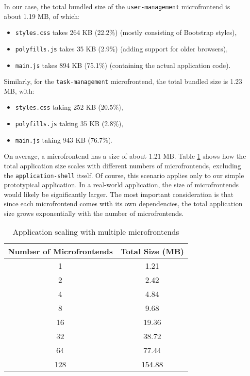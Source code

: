 \noindent
In our case, the total bundled size of the \texttt{user-management} microfrontend is about 1.19 MB, of which:  
\begin{itemize}
    \item \texttt{styles.css} takes 264 KB (22.2\%) (mostly consisting of Bootstrap styles),
    \item \texttt{polyfills.js} takes 35 KB (2.9\%) (adding support for older browsers),
    \item \texttt{main.js} takes 894 KB (75.1\%) (containing the actual application code).
\end{itemize}  
Similarly, for the \texttt{task-management} microfrontend, the total bundled size is 1.23 MB, with:  
\begin{itemize}
    \item \texttt{styles.css} taking 252 KB (20.5\%),
    \item \texttt{polyfills.js} taking 35 KB (2.8\%),
    \item \texttt{main.js} taking 943 KB (76.7\%).
\end{itemize}  
On average, a microfrontend has a size of about 1.21 MB. Table \ref{table:app-scaling} shows how the total application size scales with different numbers of microfrontends, excluding the \texttt{application-shell} itself. Of course, this scenario applies only to our simple prototypical application. In a real-world application, the size of microfrontends would likely be significantly larger. The most important consideration is that since each microfrontend comes with its own dependencies, the total application size grows exponentially with the number of microfrontends.
\begin{table}[h]  
    \centering  
    \begin{tabular}{|c|c|}  
        \hline  
        \textbf{Number of Microfrontends} & \textbf{Total Size (MB)} \\  
        \hline  
        1 & 1.21 \\  
        \hline  
        2 & 2.42 \\  
        \hline  
        4 & 4.84 \\  
        \hline  
        8 & 9.68 \\  
        \hline  
        16 & 19.36 \\  
        \hline  
        32 & 38.72 \\  
        \hline  
        64 & 77.44 \\  
        \hline  
        128 & 154.88 \\  
        \hline  
    \end{tabular}  
    \caption{Application scaling with multiple microfrontends}  
    \label{table:app-scaling}  
\end{table}